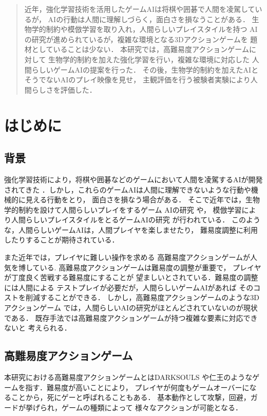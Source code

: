 \documentclass[a4paper,12pt,oneside,openany,titlepage]{jreport}
\begin{document}
\begin{abstract}
  近年，強化学習技術を活用したゲームAIは将棋や囲碁で人間を凌駕しているが， 
  AIの行動は人間に理解しづらく，面白さを損なうことがある．
  生物学的制約や模倣学習を取り入れ，人間らしいプレイスタイルを持つ
  AIの研究が進められているが，複雑な環境となる3Dアクションゲームを
  題材としていることは少ない．
  本研究では，高難易度アクションゲームに対して
  生物学的制約を加えた強化学習を行い，複雑な環境に対応した
  人間らしいゲームAIの提案を行った．
  その後，生物学的制約を加えたAIとそうでないAIのプレイ映像を見せ，
  主観評価を行う被験者実験により人間らしさを評価した．

\end{abstract}

\tableofcontents
\listoftables
\listoffigures
\newpage


\chapter{はじめに}
\thispagestyle{fancy}
\lhead{\leftmark}
\rhead{\thepage}
\renewcommand{\headrulewidth}{1pt}

\section{背景}
強化学習技術により，将棋や囲碁などのゲームにおいて人間を凌駕するAIが開発されてきた
．しかし，これらのゲームAIは人間に理解できないような行動や機械的に見える行動をとり，
面白さを損なう場合がある．
そこで近年では，生物学的制約を設けて人間らしいプレイをするゲーム
AIの研究\cite{morita}\cite{tutii}
や，%
模倣学習により人間らしいプレイスタイルをとるゲームAIの研究
\cite{fujiyama}
が行われている．
このような，人間らしいゲームAIは，人間プレイヤを楽しませたり，
難易度調整に利用したりすることが期待されている．

また近年では，プレイヤに難しい操作を求める
高難易度アクションゲームが人気を博している.
高難易度アクションゲームは難易度の調整が重要で，
プレイヤが丁度良く苦戦する難易度にすることが
望ましいとされている．難易度の調整には人間による
テストプレイが必要だが，人間らしいゲームAIがあれば
そのコストを削減することができる．
しかし，高難易度アクションゲームのような3Dアクションゲーム
では，人間らしいAIの研究がほとんどされていないのが現状である．
既存手法では高難易度アクションゲームが持つ複雑な要素に対応できないと
考えられる．
\newpage

\section{高難易度アクションゲーム}
本研究における高難易度アクションゲームとはDARKSOULS\cite{darksouls}
や仁王\cite{niou}のようなゲームを指す．難易度が高いことにより，
プレイヤが何度もゲームオーバーになることから，死にゲーと呼ばれることもある．
基本動作として攻撃，回避，ガードが挙げられ，ゲームの種類によって
様々なアクションが可能となる．
\end{document}

